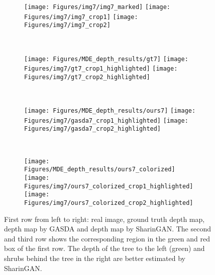 \documentclass[10pt,twocolumn,letterpaper]{article}
\begin{document}
\begin{figure*}
\begin{subfigure}[t]{\linewidth}
    \begin{subfigure}[t]{0.25\linewidth}
        \texttt{[image: Figures/img7/img7\_marked]}
        \texttt{[image: Figures/img7/img7\_crop1]}
        \texttt{[image: Figures/img7/img7\_crop2]}
    \end{subfigure}~
    \begin{subfigure}[t]{0.25\linewidth}
        \texttt{[image: Figures/MDE\_depth\_results/gt7]}
        \texttt{[image: Figures/img7/gt7\_crop1\_highlighted]}
        \texttt{[image: Figures/img7/gt7\_crop2\_highlighted]}
    \end{subfigure}~
    \begin{subfigure}[t]{0.25\linewidth}
        \texttt{[image: Figures/MDE\_depth\_results/ours7]}
        \texttt{[image: Figures/img7/gasda7\_crop1\_highlighted]}
        \texttt{[image: Figures/img7/gasda7\_crop2\_highlighted]}
    \end{subfigure}~
    \begin{subfigure}[t]{0.25\linewidth}
        \texttt{[image: Figures/MDE\_depth\_results/ours7\_colorized]}
        \texttt{[image: Figures/img7/ours7\_colorized\_crop1\_highlighted]}
        \texttt{[image: Figures/img7/ours7\_colorized\_crop2\_highlighted]}
    \end{subfigure}\caption{First row from left to right: real image, ground truth depth map, depth map by GASDA \cite{GASDA} and depth map by SharinGAN. The second and third row shows the corresponding region in the green and red box of the first row. The depth of the tree to the left (green) and shrubs behind the tree in the right are better estimated by SharinGAN.}
    \vspace*{4mm}
\end{subfigure}


\end{figure*}
\end{document}
